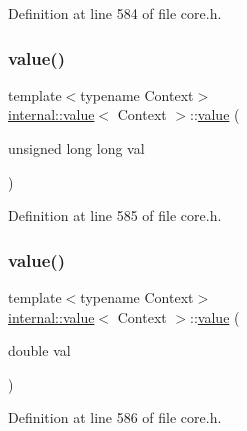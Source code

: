 Definition at line 584 of file core.\+h.

\mbox{\label{classinternal_1_1value_ab420aaab876f731accbffb6e16dd92c2}} 
\subsubsection{\texorpdfstring{value()}{value()}\hspace{0.1cm}{\footnotesize\ttfamily [4/12]}}
{\footnotesize\ttfamily template$<$typename Context$>$ \\
\hyperlink{classinternal_1_1value}{internal\+::value}$<$ Context $>$\+::\hyperlink{classinternal_1_1value}{value} (\begin{DoxyParamCaption}\item[{unsigned long long}]{val }\end{DoxyParamCaption})\hspace{0.3cm}{\ttfamily [inline]}}



Definition at line 585 of file core.\+h.

\mbox{\label{classinternal_1_1value_a778e55733b3f38997f673392134cf4c7}} 
\subsubsection{\texorpdfstring{value()}{value()}\hspace{0.1cm}{\footnotesize\ttfamily [5/12]}}
{\footnotesize\ttfamily template$<$typename Context$>$ \\
\hyperlink{classinternal_1_1value}{internal\+::value}$<$ Context $>$\+::\hyperlink{classinternal_1_1value}{value} (\begin{DoxyParamCaption}\item[{double}]{val }\end{DoxyParamCaption})\hspace{0.3cm}{\ttfamily [inline]}}



Definition at line 586 of file core.\+h.

\mbox{\label{classinternal_1_1value_a1f7f8ae55402f1722f6187ec83b82b1a}} 

